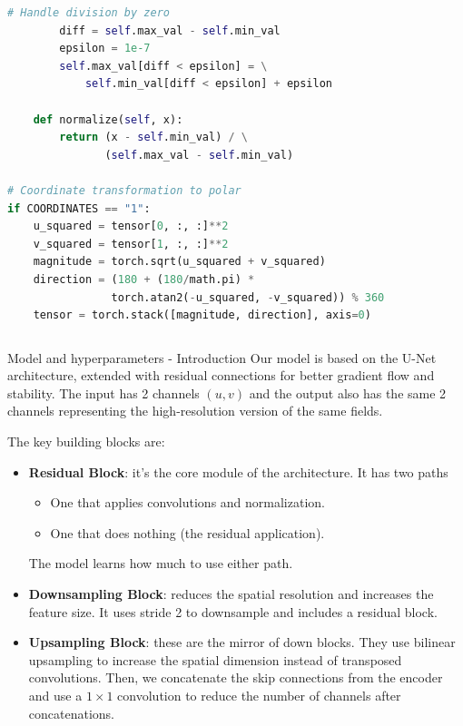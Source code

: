 \documentclass[8pt]{beamer}
\begin{document}
\begin{frame}[fragile]
\begin{columns}
\begin{column}{0.5\textwidth}
\begin{lstlisting}[language=Python, basicstyle=\ttfamily\tiny]
        # Handle division by zero
        diff = self.max_val - self.min_val
        epsilon = 1e-7
        self.max_val[diff < epsilon] = \
            self.min_val[diff < epsilon] + epsilon
        
    def normalize(self, x):
        return (x - self.min_val) / \
               (self.max_val - self.min_val)

# Coordinate transformation to polar
if COORDINATES == "1":
    u_squared = tensor[0, :, :]**2
    v_squared = tensor[1, :, :]**2
    magnitude = torch.sqrt(u_squared + v_squared)
    direction = (180 + (180/math.pi) * 
                torch.atan2(-u_squared, -v_squared)) % 360
    tensor = torch.stack([magnitude, direction], axis=0)
\end{lstlisting}
\end{column}
\end{columns}

\end{frame}



\begin{frame}{Model and hyperparameters - Introduction}
    Our model is based on the U-Net architecture, extended with residual connections for better gradient flow and stability.
    The input has 2 channels $(u,v)$ and the output also has the same 2 channels representing the high-resolution version of the same fields.

    The key building blocks are:
    \begin{itemize}
        \item \textbf{Residual Block}: it's the core module of the architecture. It has two paths
        \begin{itemize}
            \item One that applies convolutions and normalization.
            \item One that does nothing (the residual application).
        \end{itemize}
        The model learns how much to use either path.
        \item \textbf{Downsampling Block}: reduces the spatial resolution and increases the feature size. It uses stride 2 to downsample and includes a residual block.
        \item \textbf{Upsampling Block}: these are the mirror of down blocks. They use bilinear upsampling to increase the spatial dimension instead of transposed convolutions. Then, we concatenate  the skip connections from the encoder and use a $1\times 1$ convolution to reduce the number of channels after concatenations.
    \end{itemize}
\end{frame}
\end{document}
